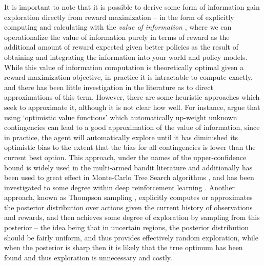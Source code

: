 It is important to note that it is possible to derive some form of information gain exploration directly from reward maximization -- in the form of explicitly computing and calculating with the \emph{value of information} \citep{still2012information,schmidhuber2007simple,osband2019deep,tishby2011information}, where we can operationalize the value of information purely in terms of reward as the additional amount of reward expected given better policies as the result of obtaining and integrating the information into your world and policy models. While this value of information computation is theoretically optimal given a reward maximization objective, in practice it is intractable to compute exactly, and there has been little investigation in the literature as to direct approximations of this term. However, there are some heuristic approaches which seek to approximate it, although it is not clear how well. For instance, \citet{osband2019deep} argue that using `optimistic value functions' which automatically up-weight unknown contingencies can lead to a good approximation of the value of information, since in practice, the agent will automatically explore until it has diminished its optimistic bias to the extent that the bias for all contingencies is lower than the current best option. This approach, under the names of the upper-confidence bound is widely used in the multi-armed bandit literature \citep{garivier2011upper} and additionally has been used to great effect in Monte-Carlo Tree Search algorithms \citep{kocsis2006bandit}, and has been investigated to some degree within deep reinforcement learning \citep{silver2017mastering}. Another approach, known as Thompson sampling \citep{russo2016information}, explicitly computes or approximates the posterior distribution over actions given the current history of observations and rewards, and then achieves some degree of exploration by sampling from this posterior -- the idea being that in uncertain regions, the posterior distribution should be fairly uniform, and thus provides effectively random exploration, while when the posterior is sharp then it is likely that the true optimum has been found and thus exploration is unnecessary and costly. 

